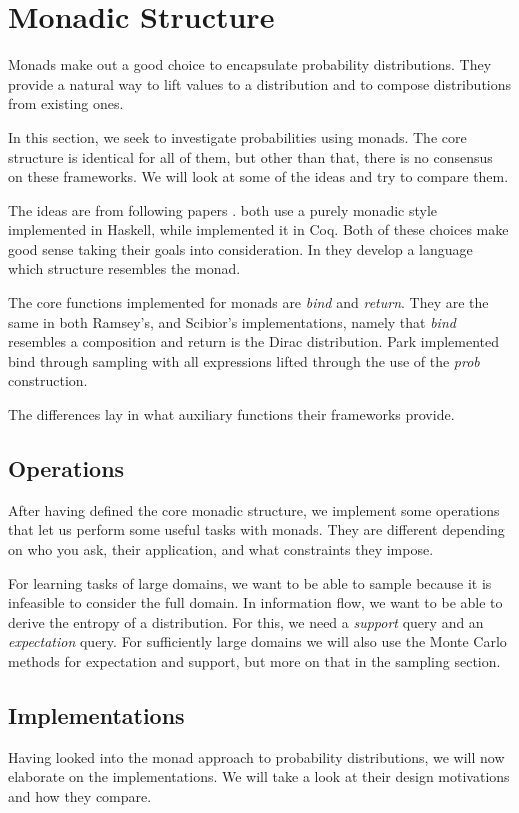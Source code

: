\section{Monadic Structure}
Monads make out a good choice to encapsulate probability distributions.
They provide a natural way to lift values to a distribution and to compose
distributions from existing ones.

In this section, we seek to investigate probabilities using
monads. The core structure is identical for all of them, but other than that,
there is no consensus on these frameworks. We will look at
some of the ideas and try to compare them.

The ideas are from following papers \cite{Ramsey:2002, Scibior:2015, Petcher:2015, Park:2008}.
\cite{Ramsey:2002, Scibior:2015} both use a purely monadic style implemented in Haskell,
while \cite{Petcher:2015} implemented it in Coq. Both of these choices make good sense taking
their goals into consideration. 
In \cite{Park:2008} they develop a language
which structure resembles the monad.

The core functions implemented for monads are \emph{bind}
and \emph{return}. They are the same in both Ramsey's, and
Scibior's implementations, namely that \emph{bind} resembles a composition and
return is the Dirac distribution. Park implemented bind through
sampling with all expressions 
lifted through the use of the \emph{prob} construction.

The differences lay in what auxiliary functions their frameworks provide.

\subsection{Operations}
After having defined the core monadic structure, we implement
some operations that let us perform some useful tasks with monads. They are
different depending on who you ask, their application,
and what constraints they impose.

For learning tasks of large domains, we want to be able to sample because it is infeasible
to consider the full domain. In information flow, we want to be able to
derive the entropy of a distribution. For this, we need a \emph{support} query and an
\emph{expectation} query. For sufficiently large domains we will also use the Monte
Carlo methods for expectation and support, but more on that in the sampling section.

\subsection{Implementations}
Having looked into the monad approach to probability distributions, we will now
elaborate on the implementations. We will take a look at their
design motivations and how they compare.


